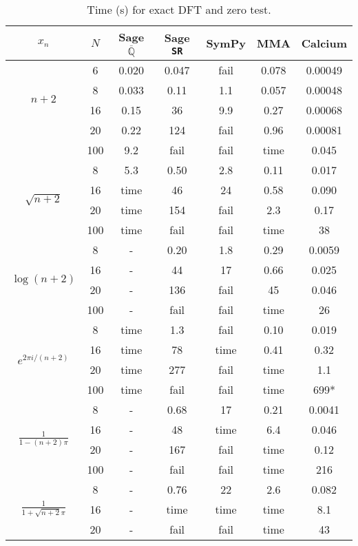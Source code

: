 \documentclass[sigconf,screen,urlbreakonhyphens]{acmart}
\begin{document}
{\renewcommand{\arraystretch}{0.9}
\begin{table}
\caption{Time (s) for exact DFT and zero test.}
\label{tab:dft}
\begin{tabular}{ c c c c c c c }
$x_n$  & $N$ & Sage $\overline{\mathbb{Q}}$ & Sage \texttt{SR} & SymPy & MMA & Calcium \\
 \hline
\multirow{4}{*}{$n+2$} & 6   & 0.020 & 0.047 & fail & 0.078   & 0.00049 \\
  & 8 & 0.033   & 0.11  & 1.1    & 0.057 & 0.00048 \\
  & 16  & 0.15  & 36    & 9.9    & 0.27    & 0.00068 \\
  & 20  & 0.22  & 124   & fail   & 0.96    & 0.00081 \\
  & 100 & 9.2   & fail  & fail   & time & 0.045 \\
\hline
\multirow{4}{*}{$\sqrt{n+2}$} & 8  &   5.3  &   0.50  &   2.8   &  0.11  &   0.017 \\
 & 16  &   time  &   46  &   24  &   0.58   &  0.090 \\
 & 20  &   time  &   154 &    fail  &   2.3   &  0.17 \\
 & 100 &    time  &   fail  &   fail  &   time   &  38 \\
\hline
\multirow{4}{*}{$\log(n+2)$\!\!\!\!} & 8  &   -  &   0.20  &   1.8   &  0.29  &   0.0059 \\
 & 16  &   -  &   44  &   17 &    0.66  &   0.025 \\
 & 20  &   -  &   136   &  fail  &   45  &   0.046 \\
 & 100  &   - &    fail   &  fail  &   time  &   26 \\
\hline
\multirow{4}{*}{\!\!$e^{2\pi i/(n+2)}$\!\!\!\!\!\!} & 8  &   time  &   1.3  &   fail  &   0.10  &   0.019 \\
  & 16  &   time  &   78   &  time  &   0.41  &   0.32 \\
  & 20  &   time  &   277   &  fail  &   time  &   1.1 \\
  & 100 &    time  &   fail  &   fail  &   time  &   699* \\
\hline
\multirow{4}{*}{\!\!$\frac{1}{1-(n+2)\pi}$\!\!\!\!\!\!} & 8  &   -   &  0.68  &   17  &   0.21  &   0.0041 \\
  & 16  &   -   &  48  &   time  &   6.4  &   0.046 \\
  & 20  &   -   &  167   &  fail  &   time  &   0.12 \\
  & 100  &   -  &   fail   &  fail  &   time  &   216 \\
\hline
\multirow{4}{*}{\!\!$\frac{1}{1+\sqrt{n+2} \pi}$\!\!\!\!\!\!} & 8  &   -  &   0.76  &   22  &   2.6 &    0.082 \\
  & 16  &   -  &   time   &  time  &   time  &   8.1 \\
  & 20  &   -  &   fail   &  fail   &  time  &   43 \\
\end{tabular}
\end{table}
}
\end{document}
